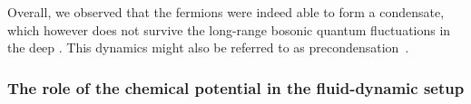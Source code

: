 Overall, we observed that the fermions were indeed able to form a condensate, which however does not survive the long-range bosonic quantum fluctuations in the deep \ir{}. This dynamics might also be referred to as precondensation~\cite{Boettcher:2012cm,Boettcher:2012dh,Boettcher:2013kia,Boettcher:2014tfa,Roscher:2015xha,Khan:2015puu}.

\subsubsection{The role of the chemical potential in the fluid-dynamic setup}\label{subsubsec:chemical_potential_mf_vs_with_bosons}
